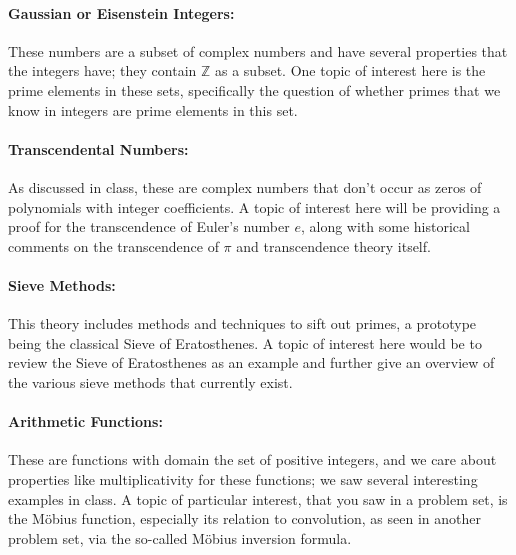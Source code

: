 \documentclass[11pt]{article}
\theoremstyle{plain}
\theoremstyle{definition}
\theoremstyle{remark}
\numberwithin{equation}{section}
\begin{document}


\paragraph{Gaussian or Eisenstein Integers:} These numbers are a subset of complex numbers and have several properties that the integers have; they contain $\mathbb{Z}$ as a subset. One topic of interest here is the prime elements in these sets, specifically the question of whether primes that we know in integers are prime elements in this set.

\paragraph{Transcendental Numbers:} As discussed in class, these are complex numbers that don't occur as zeros of polynomials with integer coefficients. A topic of interest here will be providing a proof for the transcendence of Euler's number $e$, along with some historical comments on the transcendence of $\pi$ and transcendence theory itself.

\paragraph{Sieve Methods:} This theory includes methods and techniques to sift out primes, a prototype being the classical Sieve of Eratosthenes. A topic of interest here would be to review the Sieve of Eratosthenes as an example and further give an overview of the various sieve methods that currently exist.

\paragraph{Arithmetic Functions:} These are functions with domain the set of positive integers, and we care about properties like multiplicativity for these functions; we saw several interesting examples in class. A topic of particular interest, that you saw in a problem set, is the Möbius function, especially its relation to convolution, as seen in another problem set, via the so-called Möbius inversion formula.
\end{document}
